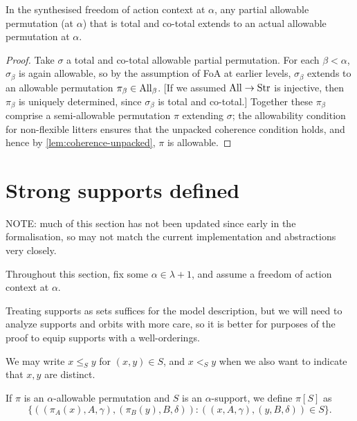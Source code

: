 \begin{proposition}
  \label{prop:total-allowable-partial-perm-actual}
  \leanok
  In the synthesised freedom of action context at $\alpha$, any partial allowable permutation (at $\alpha$) that is total and co-total extends to an actual allowable permutation at $\alpha$.
\end{proposition}

\begin{proof}
  Take $\sigma$ a total and co-total allowable partial permutation.  For each $\beta < \alpha$, $\sigma_\beta$ is again allowable, so by the assumption of FoA at earlier levels, $\sigma_\beta$ extends to an allowable permutation $\pi_\beta \in \mathrm{All}_\beta$. [If we assumed $\mathrm{All} \to \mathrm{Str}$ is injective, then $\pi_\beta$ is uniquely determined, since $\sigma_\beta$ is total and co-total.]  Together these $\pi_\beta$ comprise a semi-allowable permutation $\pi$ extending $\sigma$; the allowability condition for non-flexible litters ensures that the unpacked coherence condition holds, and hence by \cref{lem:coherence-unpacked}, $\pi$ is allowable.
\end{proof}

\section{Strong supports defined}

NOTE: much of this section has not been updated since early in the formalisation, so may not match the current implementation and abstractions very closely.

Throughout this section, fix some $\alpha \in \lambda + 1$, and assume a freedom of action context at $\alpha$.

Treating supports as sets suffices for the model description, but we will need to analyze supports and orbits with more care, so it is better for purposes
of the proof to equip supports with a well-orderings.

We may write $x \leq_S y$ for $(x,y) \in S$, and $x <_S y$ when we also want to indicate that $x,y$ are distinct.

If $\pi$ is an $\alpha$-allowable permutation and $S$ is an $\alpha$-support, we define $\pi[S]$ as $$\{((\pi_A(x),A,\gamma),(\pi_B(y),B,\delta)):((x,A,\gamma),(y,B,\delta))\in S\}.$$

